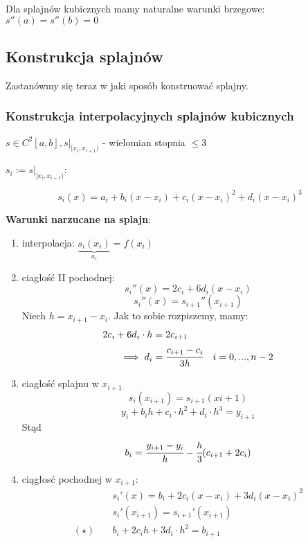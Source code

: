 \documentclass[hidelinks,a4paper,fleqn,oneside]{book}
\begin{document}
Dla splajnów kubicznych mamy naturalne warunki brzegowe: $s''(a) = s''(b) = 0$

\subsection{Konstrukcja splajnów}

Zastanówmy się teraz w jaki sposób konstruować splajny.
\subsubsection{Konstrukcja interpolacyjnych splajnów kubicznych}

$s \in C^2[a, b], s|_{[x_i, x_{i+1})}$ - wielomian stopnia $\leq 3$


$s_i := s|_{[x_i, x_{i+1})}$: 

\[
	s_i(x) = a_i + b_i(x-x_i) + c_i(x-x_i)^2 + d_i(x-x_i)^3
\]

\textbf{Warunki narzucane na splajn}:
\begin{enumerate}
	\item interpolacja: $\underbrace{s_i(x_i)}_{a_i} = f(x_i)$ 
	\item ciagłość II pochodnej:
		\[
			s_i''(x) = 2c_i + 6d_i(x-x_i)
		\]
		\[
			s_i''(x) = s_{i+1}''(x_{i+1})
		\]
		Niech $h = x_{i+1}-x_i$. Jak to sobie rozpiszemy, mamy:
		\begin{align*}
			2c_i + 6d_i \cdot h & = 2c_{i+1} \\
			\implies d_i &= \cfrac{c_{i+1}-c_i}{3h} \quad i=0, ..., n-2
		\end{align*}
		\item ciagłość splajnu w $x_{i+1}$
		\[
			s_i(x_{i+1}) = s_{i+1}(x{i+1})
		\]
		\[
			y_i + b_ih + c_i \cdot h^2 + d_i\cdot h^3 = y_{i+1}
		\]
		Stąd
		\[
			b_i = \cfrac{y_{i+1}-y_i}{h} - \cfrac{h}{3}(c_{i+1} + 2c_i)
		\]
		\item ciągłosć pochodnej w $x_{i+1}$:
		\begin{align*}
			& s_i'(x) = b_i + 2c_i(x-x_i) + 3d_i(x-x_i)^2 \\
			& s_i'(x_{i+1}) = s_{i+1}'(x_{i+1}) \\ 
			(\star) \quad & b_i + 2c_ih + 3d_i\cdot h^2 = b_{i+1}
		\end{align*}
\end{enumerate}
\end{document}
